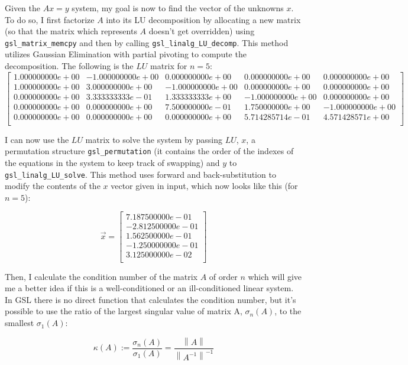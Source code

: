 \documentclass{article}
\newcommand{\code}{\texttt}
\newcommand{\norm}[1]{\left\lVert#1\right\rVert}
\begin{document}
Given the $Ax=y$ system, my goal is now to find the vector of the unknowns $x$. To do so, I first factorize $A$ into its LU decomposition by allocating a new matrix (so that the matrix which represents $A$ doesn't get overridden) using \code{gsl\_matrix\_memcpy} and then by calling \code{gsl\_linalg\_LU\_decomp}. This method utilizes Gaussian Elimination with partial pivoting to compute the decomposition. The following is the $LU$ matrix for $n=5$:
$$
\begin{bmatrix} 
1.000000000e+00 & -1.000000000e+00 & 0.000000000e+00 & 0.000000000e+00 & 0.000000000e+00 \\ 
1.000000000e+00 & 3.000000000e+00 & -1.000000000e+00 & 0.000000000e+00 & 0.000000000e+00 \\ 
0.000000000e+00 & 3.333333333e-01 & 1.333333333e+00 & -1.000000000e+00 & 0.000000000e+00 \\
0.000000000e+00 & 0.000000000e+00 & 7.500000000e-01 & 1.750000000e+00 & -1.000000000e+00 \\ 
0.000000000e+00 & 0.000000000e+00 & 0.000000000e+00 & 5.714285714e-01 & 4.571428571e+00 \\
\end{bmatrix}
$$

I can now use the $LU$ matrix to solve the system by passing $LU$, $x$, a permutation structure \code{gsl\_permutation} (it contains the order of the indexes of the equations in the system to keep track of swapping) and $y$ to \code{gsl\_linalg\_LU\_solve}. This method uses forward and back-substitution to modify the contents of the $x$ vector given in input, which now looks like this (for $n=5$):

$$
\vec{x}=
\begin{bmatrix}
7.187500000e-01\\
-2.812500000e-01\\
1.562500000e-01\\
-1.250000000e-01\\
3.125000000e-02\\
\end{bmatrix}
$$

Then, I calculate the condition number of the matrix $A$ of order $n$ which will give me a better idea if this is a well-conditioned or an ill-conditioned linear system. In GSL there is no direct function that calculates the condition number, but it's possible to use the ratio of the largest singular value of matrix A, $\sigma_n (A)$, to the smallest $\sigma_1 (A)$:

$$\kappa(A) := \frac{\sigma_n (A)}{\sigma_1 (A)}= \frac{\norm{A}}{\norm{A^{-1}}^{-1}}$$
\end{document}

